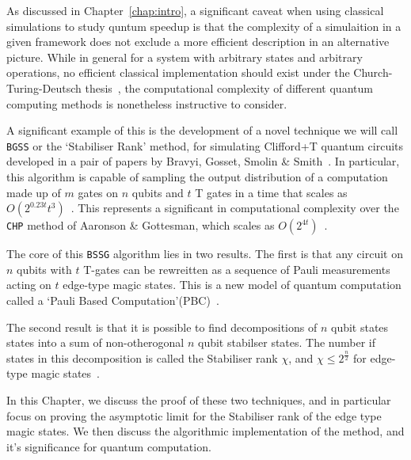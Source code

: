 \documentclass{standalone}
\begin{document}
As discussed in Chapter~\ref{chap:intro}, a significant caveat when using classical simulations to study quntum speedup is that the complexity of a simulaition in a given framework does not exclude a more efficient description in an alternative picture. While in general for a system with arbitrary states and arbitrary operations, no efficient classical implementation should exist under the Church-Turing-Deutsch thesis~\cite{Deutsch1985}, the computational complexity of different quantum computing methods is nonetheless instructive to consider. 
\par
A significant example of this is the development of a novel technique we will call \texttt{BGSS} or the `Stabiliser Rank' method, for simulating Clifford+T quantum circuits developed in a pair of papers by Bravyi, Gosset, Smolin \& Smith~\cite{Bravyi2015,Bravyi2016b}. In particular, this algorithm is capable of sampling the output distribution of a computation made up of $m$ gates on $n$ qubits and $t$ T gates in a time that scales as $O(2^{0.23t}t^{3})$~\cite{Bravyi2016b}. This represents a significant in computational complexity over the \texttt{CHP} method of Aaronson \& Gottesman, which scales as $O(2^{4t})$~\cite{Aaronson2004a}.
\par
The core of this \texttt{BSSG} algorithm lies in two results. The first is that any circuit on $n$ qubits with $t$ T-gates can be rewreitten as a sequence of Pauli measurements acting on $t$ edge-type magic states. This is a new model of quantum computation called a `Pauli Based Computation'(PBC)~\cite{Bravyi2015}. 
\par
The second result is that it is possible to find decompositions of $n$ qubit states states into a sum of non-otherogonal $n$ qubit stabilser states. The number if states in this decomposition is called the Stabiliser rank $\chi$, and $\chi\leq2^{\frac{n}{2}}$ for edge-type magic states~\cite{Bravyi2016b,Bravyi2015}.
\par
In this Chapter, we discuss the proof of these two techniques, and in particular focus on proving the asymptotic limit for the Stabiliser rank of the edge type magic states. We then discuss the algorithmic implementation of the method, and it's significance for quantum computation. 
\end{document}
